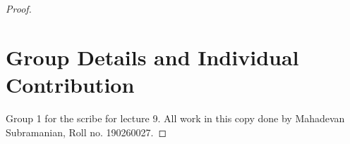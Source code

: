 \documentclass[11pt, twosides]{article}
\begin{document}
\begin{proof}
\section{Group Details and Individual Contribution}
Group 1 for the scribe for lecture 9. All work in this copy done by Mahadevan Subramanian, Roll no. 190260027. 
\end{proof}
\end{document}
